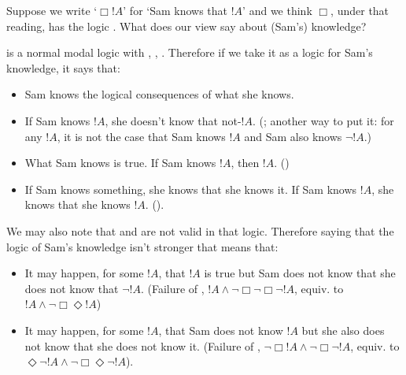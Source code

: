 \documentclass[../../../../include/open-logic-section]{subfiles}
\begin{document}
\begin{prob}
Suppose we write `$\Box !A$' for `Sam knows that $ !A$' and we
think $\Box$, under that reading, has the logic . What
does our view say about (Sam's) knowledge? 

\begin{ans}
	 is a normal modal logic with , , .
	Therefore if we take it as a logic for Sam's knowledge, it says
	that:
	\begin{itemize}
	\item Sam knows the logical consequences of what she knows.
	\item If Sam knows $!A$, she doesn't know that not-$!A$. (;
	another way to put it: for any $!A$, it is not the case that 
	Sam knows $!A$ and Sam also knows $\lnot!A$.)
	\item What Sam knows is true. If Sam knows $!A$, then $!A$. ()
	\item If Sam knows something, she knows that she knows it. If 
	Sam knows $!A$, she knows that she knows $!A$. ().
	\end{itemize}
	We may also note that  and  are not valid in that logic.
	Therefore saying that the logic of Sam's knowledge isn't stronger
	that  means that:
	\begin{itemize}
	\item It may happen, for some $!A$, that $!A$ is true but Sam 
	does not know that she does not know that $\lnot!A$. (Failure of ,
	$!A\land\lnot\Box\lnot\Box\lnot!A$, equiv. to $!A\land\lnot\Box\Diamond!A$)
	\item It may happen, for some $!A$, that Sam does not know $!A$
	but she also does not know that she does not know it. (Failure of
	, $\lnot\Box!A\land\lnot\Box\lnot!A$, equiv. to
	$\Diamond\lnot!A\land\lnot\Box\Diamond\lnot!A$).
	\end{itemize}
\end{ans}
\end{prob}
\end{document}
